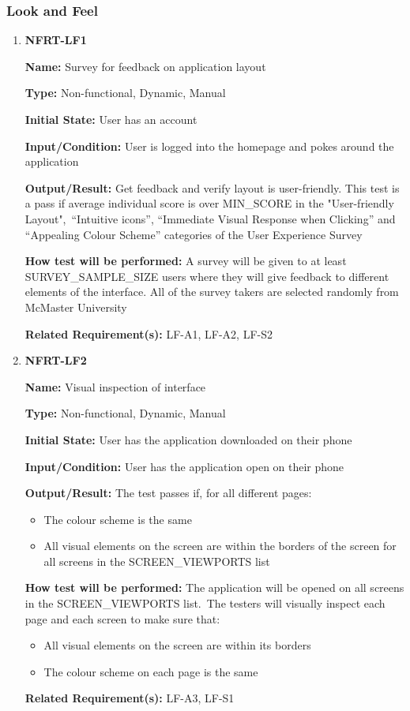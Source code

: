\documentclass[12pt, titlepage]{article}
\begin{document}
\subsubsection{Look and Feel}

\begin{enumerate}
\item{\textbf{NFRT-LF1}}

\textbf{Name:} Survey for feedback on application layout

\textbf{Type:} Non-functional, Dynamic, Manual
					
\textbf{Initial State:} User has an account

\textbf{Input/Condition:} User is logged into the homepage and pokes around the application
					
\textbf{Output/Result:} Get feedback and verify layout is user-friendly. This test is a pass if average individual score is over MIN\_SCORE in the "User-friendly Layout",\
``Intuitive icons'', ``Immediate Visual Response when Clicking'' and ``Appealing Colour Scheme'' categories of the User Experience Survey
					
\textbf{How test will be performed:} A survey will be given to at least
SURVEY\_SAMPLE\_SIZE users where they will give feedback to different elements of the interface. All of the survey takers are selected randomly from McMaster University

\textbf{Related Requirement(s):} LF-A1, LF-A2, LF-S2

\item{\textbf{NFRT-LF2}}

\textbf{Name:} Visual inspection of interface

\textbf{Type:} Non-functional, Dynamic, Manual
					
\textbf{Initial State:} User has the application downloaded on their phone
					
\textbf{Input/Condition:} User has the application open on their phone
					
\textbf{Output/Result:} The test passes if, for all different pages:
\begin{itemize}
  \item The colour scheme is the same
  \item All visual elements on the screen are within the borders of the screen for all screens in the SCREEN\_VIEWPORTS list
\end{itemize}

\textbf{How test will be performed:} The application will be opened on all screens in the SCREEN\_VIEWPORTS list.\
The testers will visually inspect each page and each screen to make sure that:
\begin{itemize}
  \item All visual elements on the screen are within its borders
  \item The colour scheme on each page is the same
\end{itemize}

\textbf{Related Requirement(s):} LF-A3, LF-S1

\end{enumerate}
\end{document}
